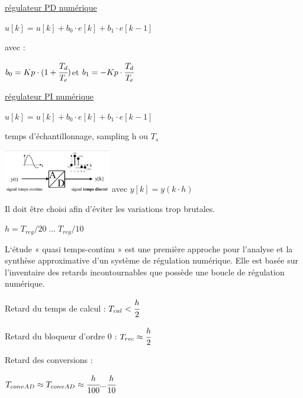 
\hformbar



\underline{régulateur PD numérique}
\vspace{3mm}

$u[k] = u[k] + b_0 \cdot e[k]+ b_1 \cdot e[k-1]$ 

avec :


\hfill $b_0 = Kp\cdot(1+\cfrac{T_d}{T_e})$\hfill et \hfill $b_1 = -Kp \cdot \cfrac{T_d}{T_e}$ \hfill

\vspace{3mm}

\underline{régulateur PI numérique}
\vspace{3mm}

$u[k] = u[k] + b_0 \cdot e[k]+ b_1 \cdot e[k-1]$ 

\hformbar



temps d'échantillonnage, sampling h ou $T_s$ 

\begin{center}
    \includegraphics[width = 0.35\textwidth]{img/echantillonage.JPG}
    avec $y[k] = y(k \cdot h)$
\end{center}


Il doit être choisi afin d'éviter les variations trop brutales.

$ h = T_{reg}/20 \; ... \; T_{reg}/10$



L‘étude « quasi temps-continu » est une première approche pour 
l’analyse et la synthèse approximative d’un système de régulation 
numérique.
Elle est basée sur l’inventaire des retards incontournables que 
possède une boucle de régulation numérique.

Retard du temps de calcul : $T_{cal} < \cfrac{h}{2}$

Retard du bloqueur d'ordre 0 : $T_{rec} \approx \cfrac{h}{2}$

\vspace{3mm}

Retard des conversions :

$T_{convAD} \approx T_{convAD} \approx \cfrac{h}{100} ... \cfrac{h}{10} $


